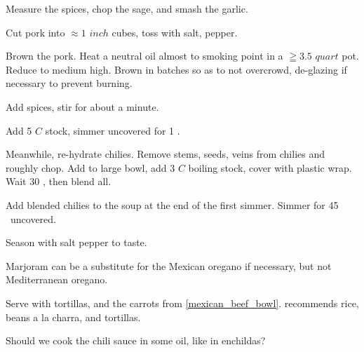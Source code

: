 \begin{preparation}
\item Measure the spices, chop the sage, and smash the garlic.

\item Cut pork into $\approx1$ $inch$ cubes, toss with salt, pepper.

\item Brown the pork.
	Heat a neutral oil almost to smoking point in a $ \geqq 3.5$ $quart$ pot.
	Reduce to medium high.
	Brown in batches so as to not overcrowd, de-glazing if necessary to prevent burning.

\item Add spices, stir for about a minute.

\item Add 5 $C$ stock, simmer uncovered for 1 \hour.

\item Meanwhile, re-hydrate chilies.
	Remove stems, seeds, veins from chilies and roughly chop.
	Add to large bowl, add 3 $C$ boiling stock, cover with plastic wrap.
	Wait 30 \minute, then blend all.

\item Add blended chilies to the soup at the end of the first simmer.
	Simmer for 45 \minute~uncovered.

\item Season with salt pepper to taste.
\end{preparation}


\begin{variation}
\item Marjoram can be a substitute for the Mexican oregano if necessary, but not Mediterranean oregano.

\item Serve with tortillas, and the carrots from  \ref{mexican_beef_bowl}.  \citeauthor{rMartinez2015} recommends rice, beans a la charra, and tortillas.
\end{variation}


\begin{experiments}
\item Should we cook the chili sauce in some oil, like in enchildas?
\end{experiments}

\recipeend
